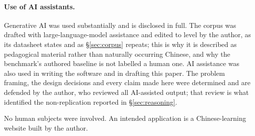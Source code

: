 \documentclass[11pt]{article}
\begin{document}
\paragraph{Use of AI assistants.} Generative AI was used substantially and is
disclosed in full. The corpus was drafted with large-language-model assistance
and edited to level by the author, as its datasheet states and as
\S\ref{sec:corpus} repeats; this is why it is described as pedagogical material
rather than naturally occurring Chinese, and why the benchmark's authored
baseline is not labelled a human one. AI assistance was also used in writing the
software and in drafting this paper. The problem framing, the design decisions
and every claim made here were determined and are defended by the author, who
reviewed all AI-assisted output; that review is what identified the
non-replication reported in \S\ref{sec:reasoning}.

No human subjects were involved. An intended application is a Chinese-learning
website built by the author.


\end{document}
